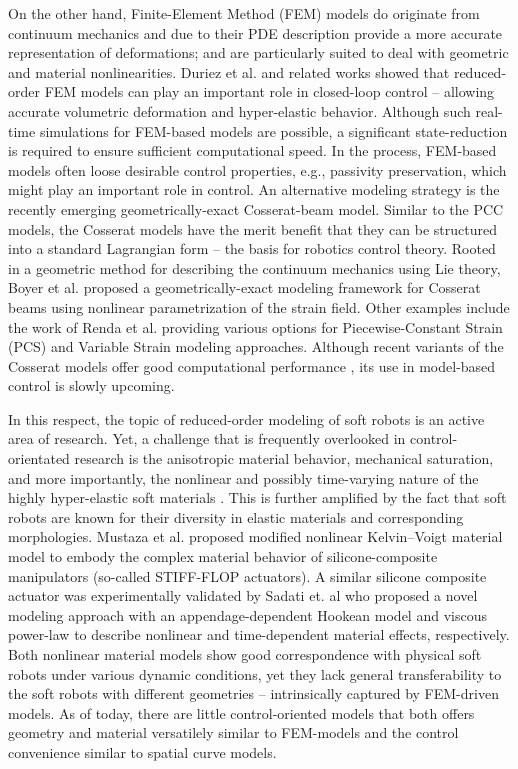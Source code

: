 On the other hand, Finite-Element Method (FEM) models do originate from continuum mechanics and due to their PDE description provide a more accurate representation of deformations; and are particularly suited to deal with geometric and material nonlinearities. Duriez et al.\cite{Duriez2013} and related works\cite{Coevoet2017,Largilliere2015} showed that reduced-order FEM models can play an important role in closed-loop control -- allowing accurate volumetric deformation and hyper-elastic behavior. Although such real-time simulations for FEM-based models are possible, a significant state-reduction is required to ensure sufficient computational speed. In the process, FEM-based models often loose desirable control properties, e.g., passivity preservation, which might play an important role in control. An alternative modeling strategy is the recently emerging geometrically-exact Cosserat-beam model. Similar to the PCC models, the Cosserat models have the merit benefit that they can be structured into a standard Lagrangian form -- the basis for robotics control theory. Rooted in a geometric method for describing the continuum mechanics using Lie theory\cite{Simo1986}, Boyer et al. \cite{Boyer2010, Boyer2021} proposed a geometrically-exact modeling framework for Cosserat beams using nonlinear parametrization of the strain field. Other examples include the work of Renda et al.\cite{Renda2018,Renda2020} providing various options for Piecewise-Constant Strain (PCS) and Variable Strain modeling approaches. Although recent variants of the Cosserat models offer good computational performance \cite{Till2019,Grazioso2019}, its use in model-based control is slowly upcoming.

In this respect, the topic of reduced-order modeling of soft robots is an active area of research. Yet, a challenge that is frequently overlooked in control-orientated research is the anisotropic material behavior, mechanical saturation, and more importantly, the nonlinear and possibly time-varying nature of the highly hyper-elastic soft materials \cite{Falkenhahn2015, Mochiyama2003, Till2019, Tatlicioglu2007}. This is further amplified by the fact that soft robots are known for their diversity in elastic materials and corresponding morphologies. Mustaza et al.\cite{Mustaza2019} proposed modified nonlinear Kelvin–Voigt material model to embody the complex material behavior of silicone-composite manipulators (so-called STIFF-FLOP actuators). A similar silicone composite actuator was experimentally validated by Sadati et. al \cite{Sadati2021} who proposed a novel modeling approach with an appendage-dependent Hookean model and viscous power-law to describe nonlinear and time-dependent material effects, respectively. Both nonlinear material models show good correspondence with physical soft robots under various dynamic conditions, yet they lack general transferability to the soft robots with different geometries -- intrinsically captured by FEM-driven models. As of today, there are little control-oriented models that both offers geometry and material versatilely similar to FEM-models and the control convenience similar to spatial curve models.

